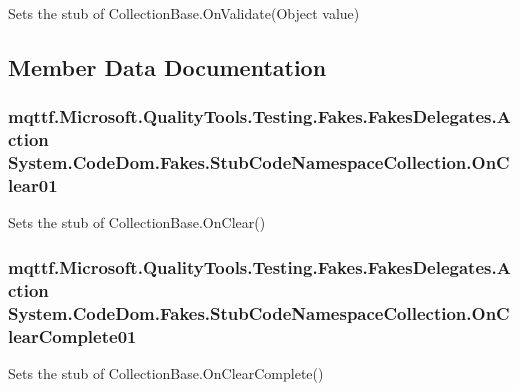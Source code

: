 Sets the stub of Collection\-Base.\-On\-Validate(\-Object value)



\subsection{Member Data Documentation}
\hypertarget{class_system_1_1_code_dom_1_1_fakes_1_1_stub_code_namespace_collection_ab9e49e76a74f5a733271dd1cf91d0515}{
\subsubsection[{On\-Clear01}]{\setlength{\rightskip}{0pt plus 5cm}mqttf.\-Microsoft.\-Quality\-Tools.\-Testing.\-Fakes.\-Fakes\-Delegates.\-Action System.\-Code\-Dom.\-Fakes.\-Stub\-Code\-Namespace\-Collection.\-On\-Clear01}}\label{class_system_1_1_code_dom_1_1_fakes_1_1_stub_code_namespace_collection_ab9e49e76a74f5a733271dd1cf91d0515}


Sets the stub of Collection\-Base.\-On\-Clear()

\hypertarget{class_system_1_1_code_dom_1_1_fakes_1_1_stub_code_namespace_collection_ae6c2972d3497d4a1b32f2053ec6d3e8b}{
\subsubsection[{On\-Clear\-Complete01}]{\setlength{\rightskip}{0pt plus 5cm}mqttf.\-Microsoft.\-Quality\-Tools.\-Testing.\-Fakes.\-Fakes\-Delegates.\-Action System.\-Code\-Dom.\-Fakes.\-Stub\-Code\-Namespace\-Collection.\-On\-Clear\-Complete01}}\label{class_system_1_1_code_dom_1_1_fakes_1_1_stub_code_namespace_collection_ae6c2972d3497d4a1b32f2053ec6d3e8b}


Sets the stub of Collection\-Base.\-On\-Clear\-Complete()

